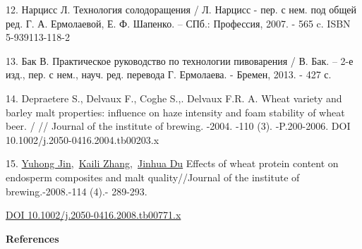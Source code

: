 \begin{references}
12. Нарцисс Л. Технология солодоращения / Л. Нарцисс - пер. с нем. под
общей ред. Г. А. Ермолаевой, Е. Ф. Шапенко. -- СПб.: Профессия, 2007. -
565 c. ISBN 5-939113-118-2

13. Бак В. Практическое руководство по технологии пивоварения / В. Бак.
-- 2-е изд., пер. с нем., науч. ред. перевода Г. Ермолаева. - Бремен,
2013. - 427 с.

14. Depraetere S., Delvaux F., Coghe S.,. Delvaux F.R. A. Wheat variety
and barley malt properties: influence on haze intensity and foam
stability of wheat beer. / // Journal of the institute of brewing.
-2004. -110 (3). -P.200-2006. DOI 10.1002/j.2050-0416.2004.tb00203.x

15. \href{https://onlinelibrary.wiley.com/authored-by/Jin/Yuhong}{Yuhong
Jin},~\href{https://onlinelibrary.wiley.com/authored-by/Zhang/Kaili}{Kaili
Zhang},~\href{https://onlinelibrary.wiley.com/authored-by/Du/Jinhua}{Jinhua
Du} Effects of wheat protein content on endosperm composites and malt
quality//Journal of the institute of brewing.-2008.-114 (4).- 289-293.

\href{https://doi.org/10.1002/j.2050-0416.2008.tb00771.x}{DOI
10.1002/j.2050-0416.2008.tb00771.x}
\end{references}

\begin{center}
{\bfseries References}
\end{center}

